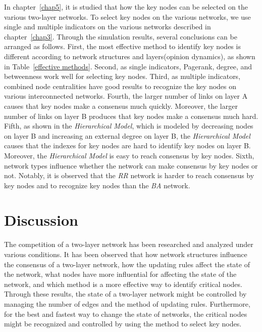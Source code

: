 In chapter~\ref{chap5}, it is studied that how the key nodes can be selected on the various two-layer networks. To select key nodes on the various networks, we use single and multiple indicators on the various networks described in chapter~\ref{chap3}. Through the simulation results, several conclusions can be arranged as follows. First, the most effective method to identify key nodes is different according to network structures and layers(opinion dynamics), as shown in Table~\ref{effective methods}. Second, as single indicators, Pagerank, degree, and betweenness work well for selecting key nodes. Third, as multiple indicators, combined node centralities have good results to recognize the key nodes on various interconnected networks. Fourth, the larger number of links on layer A causes that key nodes make a consensus much quickly. Moreover, the larger number of links on layer B produces that key nodes make a consensus much hard. Fifth, as shown in the \textit{Hierarchical Model}, which is modeled by decreasing nodes on layer B and increasing an external degree on layer B, the \textit{Hierarchical Model} causes that the indexes for key nodes are hard to identify key nodes on layer B. Moreover, the \textit{Hierarchical Model} is easy to reach consensus by key nodes. Sixth, network types influence whether the network can make consensus by key nodes or not. Notably, it is observed that the \textit{RR} network is harder to reach consensus by key nodes and to recognize key nodes than the \textit{BA} network. \\
  
\section{Discussion} 

The competition of a two-layer network has been researched and analyzed under various conditions. It has been observed that how network structures influence the consensus of a two-layer network, how the updating rules affect the state of the network, what nodes have more influential for affecting the state of the network, and which method is a more effective way to identify critical nodes. Through these results, the state of a two-layer network might be controlled by managing the number of edges and the method of updating rules. Furthermore, for the best and fastest way to change the state of networks, the critical nodes might be recognized and controlled by using the method to select key nodes.

